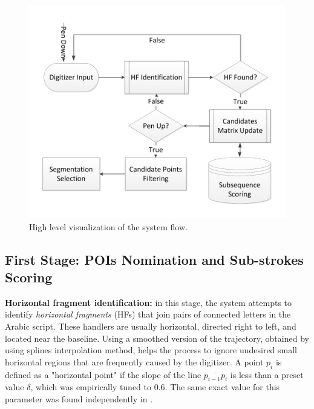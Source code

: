 \documentclass[10pt, conference, compsocconf]{IEEEtran}
\begin{document}
\begin{figure}
\centering
\includegraphics[width=1\columnwidth]{./figures/system_flow}
\caption{High level visualization of the system flow.}
\label{fig:system_flow}
\vspace{-15pt}
\end{figure}

\subsection{First Stage: POIs Nomination and Sub-strokes Scoring}

\textbf{Horizontal fragment identification:} in this stage, the system attempts to identify \emph{horizontal fragments} (HFs) that join pairs of connected letters in the Arabic script. 
These handlers are usually horizontal, directed right to left, and located near the baseline. 
Using a smoothed version of the trajectory, obtained by using splines interpolation method, helps the process to ignore undesired small horizontal regions that are frequently caused by the digitizer.  
A point $p_{i}$ is defined as a "horizontal point" if the slope of the line $\overline{p_{i-1}p_{i}}$ is less than a preset value $\delta$, which was empirically tuned to $0.6$. 
The same exact value for this parameter was found independently in \cite{daifallah2009recognition}.

\end{document}
